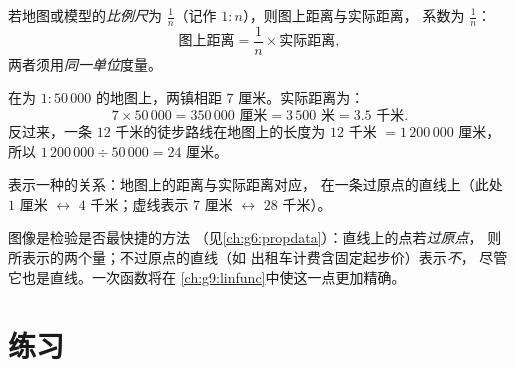 \begin{definition}[比例尺]\label{def:g7:prop:scale}
若地图或模型的\emph{比例尺}为
$\frac{1}{n}$（记作 $1 : n$），则图上距离与实际距离，
系数为 $\frac1n$：
\[
\text{图上距离} = \frac{1}{n} \times \text{实际距离},
\]
两者须用\emph{同一单位}度量。
\end{definition}

\begin{example}\label{ex:g7:prop:scale}
在为 $1 : 50\,000$ 的地图上，两镇相距 $7$ 厘米。实际距离为：
\[
7 \times 50\,000 = 350\,000 \text{ 厘米} = 3\,500 \text{ 米} = 3.5
\text{ 千米}.
\]
反过来，一条 $12$ 千米的徒步路线在地图上的长度为
$12$ 千米 $= 1\,200\,000$ 厘米，所以 $1\,200\,000 \div 50\,000 = 24$ 厘米。
\end{example}

\begin{omfigure}

{\small {}表示一种的关系：地图上的距离与实际距离对应，
在一条过原点的直线上（此处
$1$ 厘米 $\leftrightarrow$ $4$ 千米；虚线表示 $7$ 厘米
$\leftrightarrow$ $28$ 千米）。}
\end{omfigure}

\begin{remark}
图像是检验是否最快捷的方法
（见\cref{ch:g6:propdata}）：直线上的点若\emph{过原点}，
则所表示的两个量；不过原点的直线（如
出租车计费含固定起步价）表示\emph{不}，
尽管它也是直线。一次函数将在
\cref{ch:g9:linfunc}中使这一点更加精确。
\end{remark}

\section{练习}

